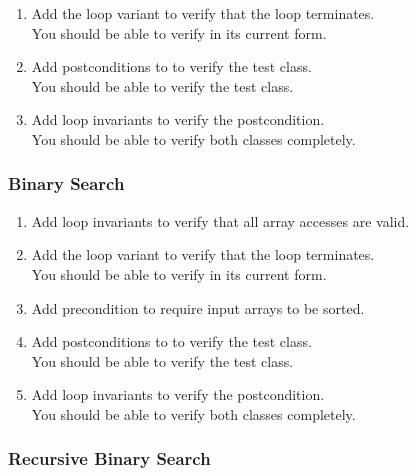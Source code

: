 \begin{enumerate}[label=\bfseries Task \arabic*:, leftmargin=1.8cm]
\item Add the loop variant to verify that the loop terminates. \\
      You should be able to verify  in its current form.
\item Add postconditions to  to verify the test class. \\
      You should be able to verify the test class.
\item Add loop invariants to verify the postcondition. \\
      You should be able to verify both classes completely.
\end{enumerate}

\subsubsection*{Binary Search}

\begin{enumerate}[label=\bfseries Task \arabic*:, leftmargin=1.8cm]
\item Add loop invariants to verify that all array accesses are valid.
\item Add the loop variant to verify that the loop terminates. \\
      You should be able to verify  in its current form.
\item Add precondition to require input arrays to be sorted.
\item Add postconditions to  to verify the test class. \\
      You should be able to verify the test class.
\item Add loop invariants to verify the postcondition. \\
      You should be able to verify both classes completely.
\end{enumerate}

\subsubsection*{Recursive Binary Search}

